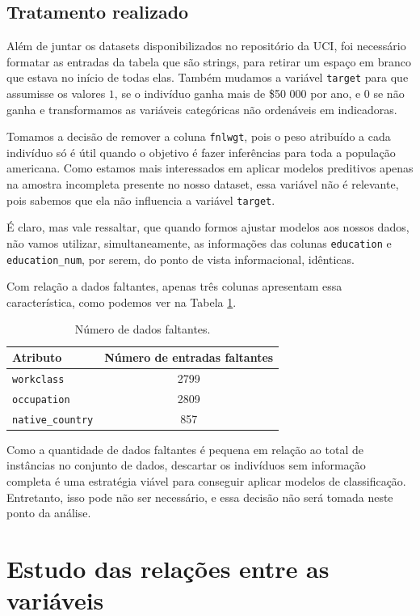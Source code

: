 \documentclass[a4paper, 12pt]{article}
\begin{document}
\subsection{Tratamento realizado}

Além de juntar os datasets disponibilizados no repositório da UCI, foi necessário formatar as entradas da tabela que são strings, para retirar um espaço em branco que estava no início de todas elas.
Também mudamos a variável \verb|target| para que assumisse os valores \( 1 \), se o indivíduo ganha mais de \$50 000 por ano, e \( 0 \) se não ganha e transformamos as variáveis categóricas não ordenáveis em indicadoras.

Tomamos a decisão de remover a coluna \verb|fnlwgt|, pois o peso atribuído a cada indivíduo só é útil quando o objetivo é fazer inferências para toda a população americana.
Como estamos mais interessados em aplicar modelos preditivos apenas na amostra incompleta presente no nosso dataset, essa variável não é relevante, pois sabemos que ela não influencia a variável \verb|target|.

É claro, mas vale ressaltar, que quando formos ajustar modelos aos nossos dados, não vamos utilizar, simultaneamente, as informações das colunas \verb|education| e \verb|education_num|, por serem, do ponto de vista informacional, idênticas.


Com relação a dados faltantes, apenas três colunas apresentam essa característica, como podemos ver na Tabela \ref{tab: missing_data}.
\begin{table}
    \centering
    \begin{tabular}{l|c}
        Atributo & Número de entradas faltantes \\
        \hline
        \verb|workclass| & 2799 \\
        \verb|occupation| & 2809 \\
        \verb|native_country| & 857 \\
    \end{tabular}
    \label{tab: missing_data}
    \caption{Número de dados faltantes.}
\end{table}
Como a quantidade de dados faltantes é pequena em relação ao total de instâncias no conjunto de dados, descartar os indivíduos sem informação completa é uma estratégia viável para conseguir aplicar modelos de classificação.
Entretanto, isso pode não ser necessário, e essa decisão não será tomada neste ponto da análise.

\section{Estudo das relações entre as variáveis}
\end{document}
